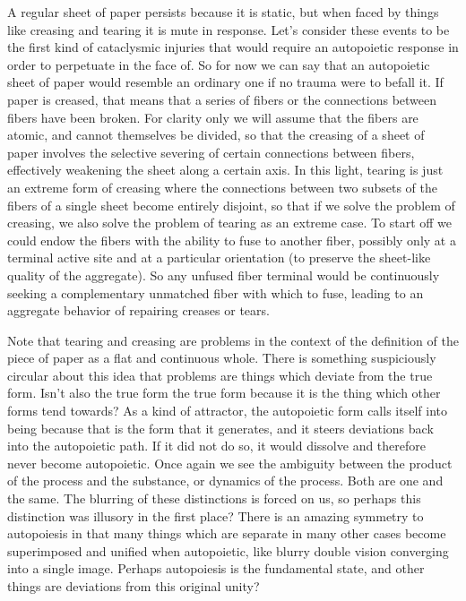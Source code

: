 \documentclass[12pt]{scrartcl}
\begin{document}
A regular sheet of paper persists because it is static, but when faced by things like creasing and tearing it is mute in response.  Let's consider these events to be the first kind of cataclysmic injuries that would require an autopoietic response in order to perpetuate in the face of.  So for now we can say that an autopoietic sheet of paper would resemble an ordinary one if no trauma were to befall it.  If paper is creased, that means that a series of fibers or the connections between fibers have been broken.  For clarity only we will assume that the fibers are atomic, and cannot themselves be divided, so that the creasing of a sheet of paper involves the selective severing of certain connections between fibers, effectively weakening the sheet along a certain axis.  In this light, tearing is just an extreme form of creasing where the connections between two subsets of the fibers of a single sheet become entirely disjoint, so that if we solve the problem of creasing, we also solve the problem of tearing as an extreme case.  To start off we could endow the fibers with the ability to fuse to another fiber, possibly only at a terminal active site and at a particular orientation (to preserve the sheet-like quality of the aggregate).  So any unfused fiber terminal would be continuously seeking a complementary unmatched fiber with which to fuse, leading to an aggregate behavior of repairing creases or tears.  

Note that tearing and creasing are problems in the context of the definition of the piece of paper as a flat and continuous whole.  There is something suspiciously circular about this idea that problems are things which deviate from the true form.  Isn't also the true form the true form because it is the thing which other forms tend towards?  As a kind of attractor, the autopoietic form calls itself into being because that is the form that it generates, and it steers deviations back into the autopoietic path.  If it did not do so, it would dissolve and therefore never become autopoietic.  Once again we see the ambiguity between the product of the process and the substance, or dynamics of the process.  Both are one and the same.  The blurring of these distinctions is forced on us, so perhaps this distinction was illusory in the first place?  There is an amazing symmetry to autopoiesis in that many things which are separate in many other cases become superimposed and unified when autopoietic, like blurry double vision converging into a single image.  Perhaps autopoiesis is the fundamental state, and other things are deviations from this original unity?
\end{document}
